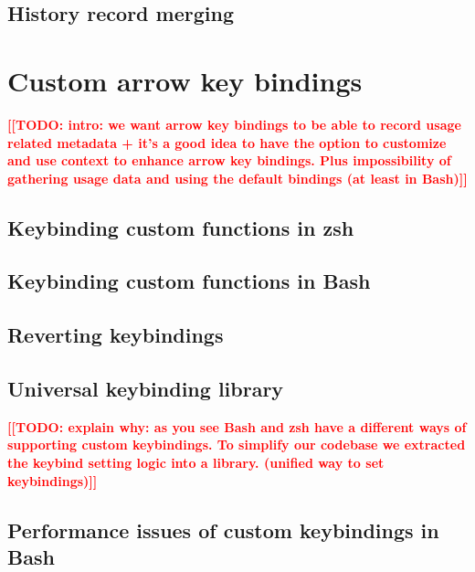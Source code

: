 \documentclass[thesis=M,english]{FITthesis}[2012/10/20]
\newcommand{\blind}[1][1]{}
\newcommand{\todotext}[1]{\textcolor{red}{\textbf{[[#1]]}}}
\begin{document}
\blind

\subsection{History record merging}

\blind

\section{Custom arrow key bindings}

\todotext{TODO: intro: we want arrow key bindings to be able to record usage related metadata + it's a good idea to have the option to customize and use context to enhance arrow key bindings. Plus impossibility of gathering usage data and using the default bindings (at least in Bash)}

\blind

\subsection{Keybinding custom functions in zsh}

\blind

\subsection{Keybinding custom functions in Bash}

\blind

\subsection{Reverting keybindings}

\blind

\subsection{Universal keybinding library}
\todotext{TODO: explain why: as you see Bash and zsh have a different ways of supporting custom keybindings. To simplify our codebase we extracted the keybind setting logic into a library. (unified way to set keybindings)}

\blind

\subsection{Performance issues of custom keybindings in Bash}
\end{document}
